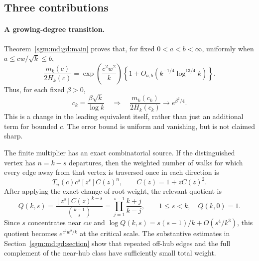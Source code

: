 \documentclass[11pt,letterpaper]{article}
\theoremstyle{remark}\newtheorem{remark}[theorem]{Remark}
\theoremstyle{definition}\newtheorem{definition}[theorem]{Definition}
\begin{document}
\subsection{Three contributions}

\paragraph{A growing-degree transition.}
Theorem~\ref{sgm:md:gd:main} proves that, for fixed $0<a<b<\infty$, uniformly
when $a\le cw/\sqrt{k}\le b$,
\begin{equation}\label{sgm:md:intro:critical}
 \frac{m_k(c)}{2H_k(c)}
 =\exp\!\left(\frac{c^2w^2}{k}\right)
 \left\{1+O_{a,b}\!\left(k^{-1/4}\log^{13/4}k\right)\right\}.
\end{equation}
Thus, for each fixed $\beta>0$,
\begin{equation}\label{sgm:md:intro:beta}
 c_k=\frac{\beta\sqrt{k}}{\log k}
 \quad\Longrightarrow\quad
 \frac{m_k(c_k)}{2H_k(c_k)}\longrightarrow e^{\beta^2/4}.
\end{equation}
This is a change in the leading equivalent itself, rather than just
an additional term for bounded $c$. The error bound is uniform and
vanishing, but is not claimed sharp.

The finite multiplier has an exact combinatorial source. If the
distinguished vertex has $n=k-s$ departures, then the weighted number
of walks for which every edge away from that vertex is traversed once
in each direction is
\begin{equation}\label{sgm:md:intro:forest}
 T_n(c)c^s[z^s]C(z)^n,
 \qquad C(z)=1+zC(z)^2.
\end{equation}
After applying the exact change-of-root weight, the relevant quotient
is
\begin{equation}\label{sgm:md:intro:Q}
 Q(k,s)=\frac{[z^s]C(z)^{k-s}}{\binom{k-1}{s}}
       =\prod_{j=1}^{s-1}\frac{k+j}{k-j},\qquad 1\le s<k,
 \quad Q(k,0)=1.
\end{equation}
Since $s$ concentrates near $cw$ and
$\log Q(k,s)=s(s-1)/k+O(s^4/k^3)$, this quotient becomes $e^{c^2w^2/k}$
at the critical scale. The substantive estimates in
Section~\ref{sgm:md:gd:section} show that repeated off-hub edges and the full
complement of the near-hub class have sufficiently small total weight.
\end{document}
